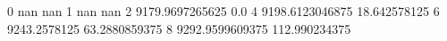 0 nan nan
1 nan nan
2 9179.9697265625 0.0
4 9198.6123046875 18.642578125
6 9243.2578125 63.2880859375
8 9292.9599609375 112.990234375
